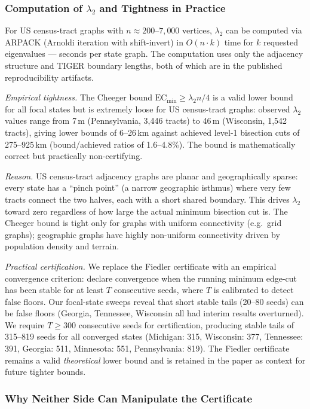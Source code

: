 \subsubsection{Computation of $\lambda_2$ and Tightness in Practice}

For US census-tract graphs with $n \approx 200$--$7{,}000$ vertices,
$\lambda_2$ can be computed via ARPACK (Arnoldi iteration with shift-invert)
in $O(n \cdot k)$ time for $k$ requested eigenvalues --- seconds per state
graph. The computation uses only the adjacency structure and TIGER boundary
lengths, both of which are in the published reproducibility artifacts.

\emph{Empirical tightness.} The Cheeger bound $\mathrm{EC}_{\min} \geq
\lambda_2 n/4$ is a valid lower bound for all focal states but is
extremely loose for US census-tract graphs: observed $\lambda_2$ values range
from 7\,m (Pennsylvania, 3{,}446 tracts) to 46\,m (Wisconsin, 1{,}542
tracts), giving lower bounds of 6--26\,km against achieved level-1 bisection
cuts of 275--925\,km (bound/achieved ratios of 1.6--4.8\%). The bound is
mathematically correct but practically non-certifying.

\emph{Reason.} US census-tract adjacency graphs are planar and geographically
sparse: every state has a ``pinch point'' (a narrow geographic isthmus) where
very few tracts connect the two halves, each with a short shared boundary.
This drives $\lambda_2$ toward zero regardless of how large the actual minimum
bisection cut is. The Cheeger bound is tight only for graphs with uniform
connectivity (e.g.\ grid graphs); geographic graphs have highly non-uniform
connectivity driven by population density and terrain.

\emph{Practical certification.} We replace the Fiedler certificate with an
empirical convergence criterion: declare convergence when the running minimum
edge-cut has been stable for at least $T$ consecutive seeds, where $T$ is
calibrated to detect false floors. Our focal-state sweeps reveal that short
stable tails (20--80 seeds) can be false floors (Georgia, Tennessee, Wisconsin
all had interim results overturned). We require $T \geq 300$ consecutive seeds
for certification, producing stable tails of 315--819 seeds for all converged
states (Michigan: 315, Wisconsin: 377, Tennessee: 391, Georgia: 511,
Minnesota: 551, Pennsylvania: 819). The Fiedler certificate remains a valid \emph{theoretical} lower bound
and is retained in the paper as context for future tighter bounds.

\subsubsection{Why Neither Side Can Manipulate the Certificate}

